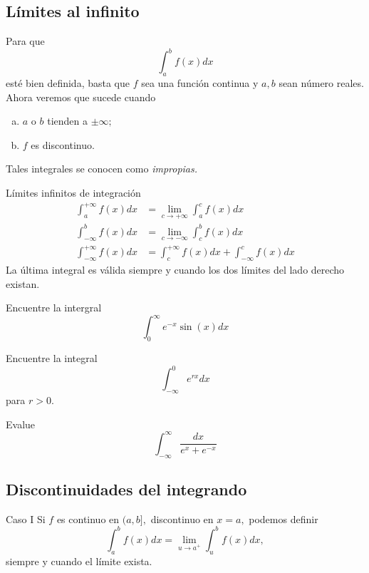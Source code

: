 \subsection{L\'imites al infinito}


Para que $$\displaystyle\int_{a}^{b}f(x)dx$$ est\'e bien definida, basta que $f$ sea una funci\'on continua y $a,b$ sean número reales. Ahora veremos que sucede cuando
\begin{enumerate}[(a)]
 \item  $a$ o $b$ tienden a $\pm \infty;$
 \item $f$ es discontinuo.
\end{enumerate}

Tales integrales se conocen como \emph{impropias.}
 

{L\'imites infinitos de integraci\'on}
\begin{align}
\label{35.a}
 \displaystyle\int_{a}^{+\infty}f(x)dx &= \lim_{c\to +\infty} \int_{a}^{c}f(x)dx \\
\label{35.b}
 \displaystyle\int_{-\infty}^{b}f(x)dx &= \lim_{c\to -\infty} \int_{c}^{b}f(x)dx \\
 \label{35.c}
 \int_{-\infty}^{+\infty}f(x)dx &= \int_{c}^{+\infty}f(x)dx+\int_{-\infty}^{c}f(x)dx
\end{align}
La última integral es válida siempre y cuando los dos l\'imites del lado derecho existan.



\begin{problema}
\label{solved:35.6}
 Encuentre la intergral 
 $$\displaystyle \int_{0}^{\infty}e^{-x}\sin(x) dx$$
\end{problema}




\begin{problema}
 \label{solved:35.4}
Encuentre la integral
$$\displaystyle \int_{-\infty}^{0} e^{rx}dx$$ para $r>0.$
\end{problema}




\begin{problema}
 \label{solved:35.7}
Evalue 
$$
\displaystyle \int_{-\infty}^{\infty}
\dfrac{dx}{e^{x}+e^{-x}}
$$
\end{problema}


\subsection{Discontinuidades del integrando}

{Caso I}
Si $f$ es continuo en $(a,b],$ discontinuo en $x=a,$ podemos definir
$$
\displaystyle \int_{a}^{b}f(x)dx=\lim_{u\to a^{+}} \int_{u}^{b}f(x)dx,
$$ siempre y cuando el l\'imite exista.


